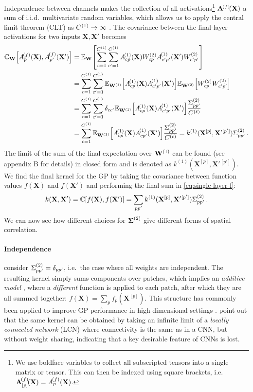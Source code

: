 \documentclass{article}
\theoremstyle{definition}
\newcommand{\vX}{\mathbf{X}}
\newcommand{\vW}{\mathbf{W}}
\begin{document}
Independence between channels makes the collection of all activations\footnote{We use boldface variables to collect all subscripted tensors into a single matrix or tensor. This can then be indexed using square brackets, i.e.~$\layerNLA{(f)}{[p]} = \layerNLAs{(f)}{p}$.} $\layerNLA{(f)}{}$ a sum of i.i.d.~multivariate random variables, which allows us to apply the central limit theorem (CLT) as $C^{(1)}\to\infty$ \citep{neal1996bayesian}. The covariance between the final-layer activations for two inputs $\vX,\vX'$ becomes
\begin{align}
    \mathbb{C}_{\vW}\left[\layerNLAs{(f)}{p},\layerNLAsd{(f)}{p'}\right] &= \Exp{\vW}{\sum_{c=1}^{\layerC1}\sum_{c'=1}^{\layerC1} \layerNLAs{(1)}{cp}\layerWs{2}_{cp}\layerNLAsd{(1)}{c'p'}\layerWs{2}_{c'p'}} \nonumber \\
    &= \sum_{c=1}^{\layerC1}\sum_{c'=1}^{\layerC1} \Exp{\layerW1}{\layerNLAs{(1)}{cp}\layerNLAsd{(1)}{c'p'}}\Exp{\layerW2}{\layerWs{2}_{cp} \layerWs{2}_{c'p'}} \nonumber \\
    &= \sum_{c=1}^{\layerC1}\sum_{c'=1}^{\layerC1} \delta_{cc'} \Exp{\layerW1}{\layerNLAs{(1)}{cp}\layerNLAsd{(1)}{c'p'}}\frac{\priorWcovs{2}_{pp'}}{\layerC{\ell}} \nonumber \\
    &= \sum_{c=1}^{\layerC1} \Exp{\layerW1}{\layerNLAs{(1)}{cp}\layerNLAsd{(1)}{cp'}} \frac{\priorWcovs{2}_{pp'}}{\layerC{\ell}} = k^{(1)}(\vX^{[p]}, {\vX'}{}^{[p']}) \priorWcovs{2}_{pp'} \,.
\end{align}
The limit of the sum of the final expectation over $\layerW1$ can be found (see appendix B for details) in closed form and is denoted as $k^{(1)}(\vX^{[p]}, {\vX'}{}^{[p']})$.
We find the final kernel for the GP by taking the covariance between function values $f(\vX)$ and $f(\vX')$ and performing the final sum in \cref{eq:single-layer-f}:
\begin{align}
    k(\vX, \vX') = \mathbb{C}\left[f(\vX), f(\vX')\right] = \sum_{pp'} k^{(1)}(\vX^{[p]}, {\vX'}{}^{[p']}) \priorWcovs{2}_{pp'} \,.
\end{align}
We can now see how different choices for $\boldsymbol{\Sigma}^{(2)}$ give different forms of spatial correlation.

\paragraph{Independence} \citet{garriga2018infiniteconv,novak2019infiniteconv} consider $\Sigma^{(2)}_{pp'} = \delta_{pp'}$, i.e.~the case where all weights are independent. The resulting kernel simply sums components over patches, which implies an \emph{additive model} \citep{stone1985}, where a \emph{different} function is applied to each patch, after which they are all summed together: $f(\vX) = \sum_p f_p(\vX^{[p]})$. This structure has commonly been applied to improve GP performance in high-dimensional settings \citep[e.g.][]{duvenaud2011additive,durrande2012additive}. \citet{novak2019infiniteconv} point out that the same kernel can be obtained by taking an infinite limit of a \emph{locally connected network} (LCN) \citep{lecun1989generalization} where connectivity is the same as in a CNN, but without weight sharing, indicating that a key desirable feature of CNNs is lost.
\end{document}
